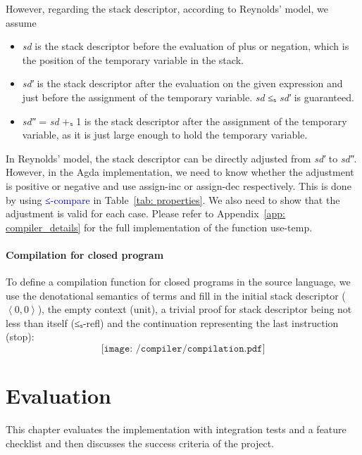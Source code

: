 \documentclass[12pt,a4paper]{report}
\theoremstyle{definition}
\newcommand{\mb}[1]{\textcolor{mediumblue}{#1}}
\newcommand{\mbt}[1]{\mb{\textsf{#1}}}
\newcommand{\ang}[1]{\left\langle #1 \right\rangle}
\begin{document}
        However, regarding the stack descriptor, according to Reynolds' model, we assume
        \begin{itemize}
            \item \textit{sd} is the stack descriptor before the evaluation of plus or negation, which is the position of the temporary variable in the stack.
            \item \textit{sd′} is the stack descriptor after the evaluation on the given expression and just before the assignment of the temporary variable. \textit{sd} ≤ₛ \textit{sd′} is guaranteed.
            \item \textit{sd″} = \textit{sd} +ₛ 1 is the stack descriptor after the assignment of the temporary variable, as it is just large enough to hold the temporary variable.
        \end{itemize}
        In Reynolds' model, the stack descriptor can be directly adjusted from \textit{sd′} to \textit{sd″}. However, in the Agda implementation, we need to know whether the adjustment is positive or negative and use \textsf{assign-inc} or \textsf{assign-dec} respectively. This is done by using \mbt{≤-compare} in Table~\ref{tab: properties}. We also need to show that the adjustment is valid for each case. Please refer to Appendix~\ref{app: compiler_details} for the full implementation of the function \textsf{use-temp}.
        

        \subsubsection{Compilation for closed program} \label{subsubsec: compilation}
        To define a compilation function for closed programs in the source language, we use the denotational semantics of terms and fill in the initial stack descriptor ($\ang{0, 0}$), the empty context (\textsf{unit}), a trivial proof for stack descriptor being not less than itself (\textsf{≤ₛ-refl}) and the continuation representing the last instruction (\textsf{stop}):
        \[\texttt{[image: /compiler/compilation.pdf]}\]




\chapter{Evaluation}
    This chapter evaluates the implementation with integration tests and a feature checklist and then discusses the success criteria of the project.
\end{document}
